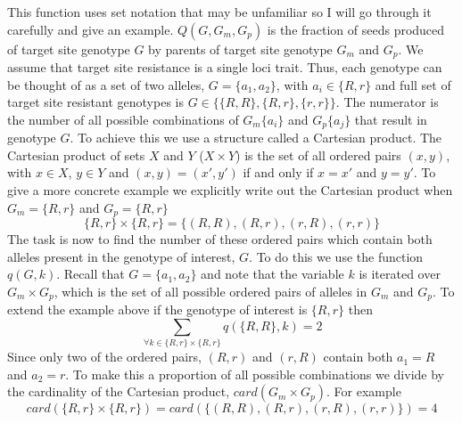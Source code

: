 \documentclass[12pt, a4paper]{article}
\begin{document}
This function uses set notation that may be unfamiliar so I will go through it carefully and give an example. $Q(G, G_m, G_p)$ is the fraction of seeds produced of target site genotype $G$ by parents of target site genotype $G_m$ and $G_p$. We assume that target site resistance is a single loci trait. Thus, each genotype can be thought of as a set of two alleles, $G = \{a_1, a_2\}$, with $a_i \in \{R, r \}$ and full set of target site resistant genotypes is $G \in \{\{R, R\}, \{R, r\}, \{r, r\} \}$. The numerator is the number of all possible combinations of $G_m\{a_i\}$ and $G_p\{a_j\}$ that result in genotype $G$. To achieve this we use a structure called a Cartesian product. The Cartesian product of sets $X$ and $Y$ ($X \times Y$) is the set of all ordered pairs $(x, y)$, with $x \in X$, $y \in Y$ and $(x, y) = (x', y')$ if and only if $x = x'$ and $y = y'$. To give a more concrete example we explicitly write out the Cartesian product when $G_m = \{R, r\}$ and $G_p = \{R, r\}$  
\begin{equation*}
	\{R, r\} \times \{R, r\} = \{(R, R), (R, r), (r, R), (r, r)\}
\end{equation*}
The task is now to find the number of these ordered pairs which contain both alleles present in the genotype of interest, $G$. To do this we use the function $q(G, k)$. Recall that $G = \{a_1, a_2\}$ and note that the variable $k$ is iterated over $G_m \times G_p$, which is the set of all possible ordered pairs of alleles in $G_m$ and $G_p$. To extend the example above if the genotype of interest is $\{R, r\}$ then 
\begin{equation*}
	\sum_{\forall k \in \{R, r\} \times \{R, r\}} q(\{R, R \}, k) = 2
\end{equation*}    
Since only two of the ordered pairs, $(R, r)$ and $(r, R)$ contain both $a_1 = R$ and $a_2 = r$. To make this a proportion of all possible combinations we divide by the cardinality of the Cartesian product, $card \left( G_m \times G_p \right)$. For example 
\begin{equation*}
	card\left( \{R, r\} \times \{R, r\} \right) = card\left( \{(R, R), (R, r), (r, R), (r, r)\} \right) = 4
\end{equation*}
\end{document}
